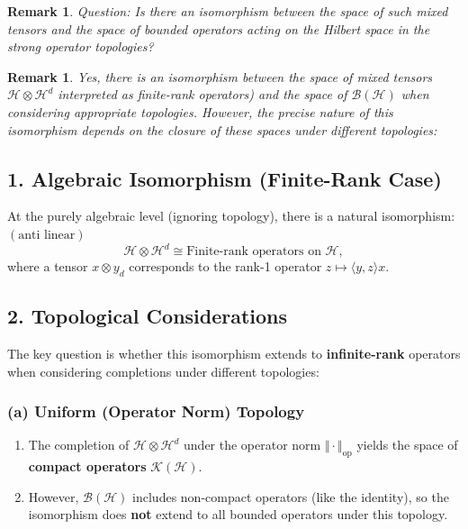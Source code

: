 \documentclass[aps,preprint]{revtex4}
\newtheorem{remark}[theorem]{Remark}
\begin{document}
\begin{remark}
Question: Is there an isomorphism between the space of such mixed tensors
and the space of bounded operators acting on the Hilbert space in the strong
operator topologies?
\end{remark}

\begin{remark}
Yes, there is an isomorphism between the space of mixed tensors $\mathcal{H}%
\otimes \mathcal{H}^{d}$ interpreted as finite-rank operators) and the space
of $\mathcal{B}\left( \mathcal{H}\right) $ when considering appropriate
topologies. However, the precise nature of this isomorphism depends on the
closure of these spaces under different topologies:
\end{remark}

\subsection*{1. Algebraic Isomorphism (Finite-Rank Case)}

At the purely algebraic level (ignoring topology), there is a natural
isomorphism: $\left( \text{anti linear}\right) $ 
\begin{equation*}
\mathcal{H}\otimes \mathcal{H}^{d}\cong \text{Finite-rank operators on }%
\mathcal{H},
\end{equation*}%
where a tensor $x\otimes y_{d}$ corresponds to the rank-1 operator $z\mapsto
\langle y,z\rangle x$.

\subsection*{2. Topological Considerations}

The key question is whether this isomorphism extends to \textbf{infinite-rank%
} operators when considering completions under different topologies:

\subsubsection*{(a) Uniform (Operator Norm) Topology}

\begin{enumerate}
\item The completion of $\mathcal{H}\otimes \mathcal{H}^{d}$ under the
operator norm $\Vert \cdot \Vert _{\text{op}}$ yields the space of \textbf{%
compact operators} $\mathcal{K}(\mathcal{H})$.

\item However, $\mathcal{B}(\mathcal{H})$ includes non-compact operators
(like the identity), so the isomorphism does \textbf{not} extend to all
bounded operators under this topology.
\end{enumerate}
\end{document}

